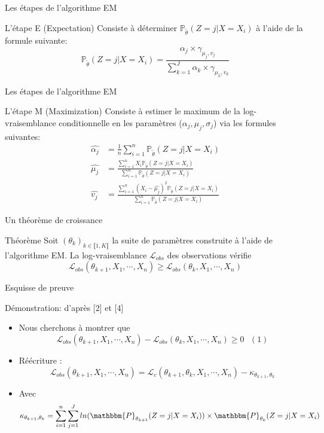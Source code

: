\documentclass[11pt]{beamer}
\begin{document}
	\begin{frame}{Les étapes de l'algorithme EM}
		\begin{block}{L'étape E (Expectation)}
			Consiste à déterminer $\mathbb{P}_{\tilde{\theta}}(Z = j | X = X_i)$ à l'aide de la formule suivante:
			\[
				\mathbb{P}_{\tilde{\theta}}(Z = j| X = X_i) = \frac{\alpha_j \times \gamma_{\mu_j, v_j}}{\sum_{k=1}^{J} \alpha_k \times \gamma_{\mu_k, v_k}}
			\]
		\end{block}
	\end{frame}
	\begin{frame}{Les étapes de l'algorithme EM}
		\begin{block}{L'étape M (Maximization)}
			Consiste à estimer le maximum de la log-vraisemblance conditionnelle en les paramètres ($\alpha_j, \mu_j, \sigma_j$)  via les formules suivantes:
			\begin{align*}
				\widehat{\alpha_j} &= \frac{1}{n}\sum_{i=1}^n \mathbb{P}_{\tilde{\theta}}(Z = j| X = X_i) \\
				\widehat{\mu_j} &= \frac{\sum_{i=1}^n X_i\mathbb{P}_{\tilde{\theta}}(Z = j| X = X_i)}{\sum_{i=1}^n \mathbb{P}_{\tilde{\theta}}(Z = j| X = X_i)} \\
				\widehat{v_j} &= \frac{\sum_{i=1}^n (X_i -\widehat{\mu_j})^2 \mathbb{P}_{\tilde{\theta}}(Z = j| X = X_i)}{\sum_{i=1}^n\mathbb{P}_{\tilde{\theta}}(Z = j| X = X_i)}
			\end{align*}
		\end{block}
	\end{frame}

	\begin{frame}{Un théorème de croissance}
		\begin{block}{Théorème}
			Soit $(\theta_k)_{k\in \llbracket1, K\rrbracket}$ la suite de paramètres construite à l'aide de l'algorithme EM. \newline
La log-vraisemblance $\mathcal{L}_{obs}$ des observations vérifie 
		\[
		\mathcal{L}_{obs}(\theta_{k+1}, X_1, \cdots, X_n) \geq \mathcal{L}_{obs}(\theta_k, X_1, \cdots, X_n)
		\]
		\end{block}
	\end{frame}

	\begin{frame}{Esquisse de preuve}
		\begin{block}{Démonstration: d'après [2] et [4]}
			\scriptsize
			\begin{itemize}
				\item Nous cherchons à montrer que
				\[
				\mathcal{L}_{obs}(\theta_{k+1}, X_1, \cdots, X_n) - \mathcal{L}_{obs}(\theta_k, X_1, \cdots, X_n) \geq 0 \text{   }(1)
				\]
				\item Réécriture :
				\[
				 \mathcal{L}_{obs}(\theta_{k+1}, X_1, \cdots, X_n) = 
				\mathcal{L}_c(\theta_{k+1}, \theta_k, X_1, \cdots, X_n) - \kappa_{\theta_{k+1},\theta_k}
				\]
				\item Avec
					\[
					 \kappa_{\theta_{k+1},\theta_k} = \sum_{i=1}^n\sum_{j=1}^J ln(\mathbbm{P}_{\theta_{k+1}}(Z = j|X=X_i))\times\mathbbm{P}_{\theta_k}(Z = j|X = X_i)
					\]
			\end{itemize}	
		\end{block}
	\end{frame}
\end{document}

